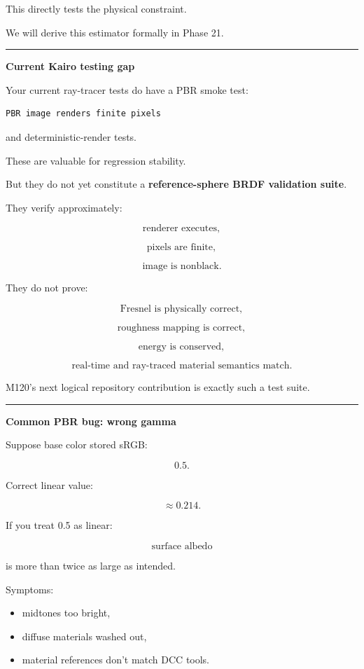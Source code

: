 This directly tests the physical constraint.

We will derive this estimator formally in Phase 21.

\begin{center}\rule{0.5\linewidth}{0.5pt}\end{center}

\textbf{Current Kairo testing gap}

Your current ray-tracer tests do have a PBR smoke test:

\begin{verbatim}
PBR image renders finite pixels
\end{verbatim}

and deterministic-render tests.

These are valuable for regression stability.

But they do not yet constitute a \textbf{reference-sphere BRDF validation suite}.

They verify approximately:

\[
\text{renderer executes},
\]

\[
\text{pixels are finite},
\]

\[
\text{image is nonblack}.
\]

They do not prove:

\[
\text{Fresnel is physically correct},
\]

\[
\text{roughness mapping is correct},
\]

\[
\text{energy is conserved},
\]

\[
\text{real-time and ray-traced material semantics match}.
\]

M120's next logical repository contribution is exactly such a test suite.

\begin{center}\rule{0.5\linewidth}{0.5pt}\end{center}

\textbf{Common PBR bug: wrong gamma}

Suppose base color stored sRGB:

\[
0.5.
\]

Correct linear value:

\[
\approx0.214.
\]

If you treat 0.5 as linear:

\[
\text{surface albedo}
\]

is more than twice as large as intended.

Symptoms:

\begin{itemize}
\tightlist
\item
  midtones too bright,
\item
  diffuse materials washed out,
\item
  material references don't match DCC tools.
\end{itemize}

